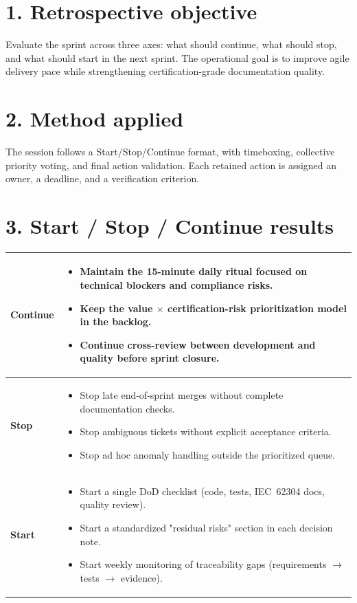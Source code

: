 \section*{1. Retrospective objective}

Evaluate the sprint across three axes: what should continue, what should stop, and what should start in the next sprint. The operational goal is to improve agile delivery pace while strengthening certification-grade documentation quality.

\section*{2. Method applied}

The session follows a Start/Stop/Continue format, with timeboxing, collective priority voting, and final action validation. Each retained action is assigned an owner, a deadline, and a verification criterion.

\section*{3. Start / Stop / Continue results}

\begin{tabularx}{\textwidth}{|p{2.2cm}|X|}
\hline
\textbf{Continue} &
\begin{itemize}
  \item Maintain the 15-minute daily ritual focused on technical blockers and compliance risks.
  \item Keep the value $\times$ certification-risk prioritization model in the backlog.
  \item Continue cross-review between development and quality before sprint closure.
\end{itemize} \\
\hline
\textbf{Stop} &
\begin{itemize}
  \item Stop late end-of-sprint merges without complete documentation checks.
  \item Stop ambiguous tickets without explicit acceptance criteria.
  \item Stop ad hoc anomaly handling outside the prioritized queue.
\end{itemize} \\
\hline
\textbf{Start} &
\begin{itemize}
  \item Start a single DoD checklist (code, tests, IEC~62304 docs, quality review).
  \item Start a standardized "residual risks" section in each decision note.
  \item Start weekly monitoring of traceability gaps (requirements $\rightarrow$ tests $\rightarrow$ evidence).
\end{itemize} \\
\hline
\end{tabularx}

